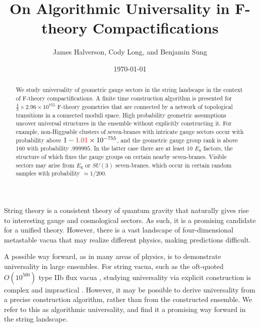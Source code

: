 \documentclass[aps,prl,twocolumn, superscriptaddress,groupedaddress,nofootinbib]{revtex4-1}
\begin{document}
\title{On Algorithmic Universality in F-theory Compactifications}
\author{James Halverson, Cody Long, and Benjamin Sung}

\date{\today}

\begin{abstract}
We study universality of geometric gauge sectors in the string landscape
in the context of F-theory compactifications.
{\color{red} A finite time construction algorithm is presented for $\frac43 \times 2.96 \times 10^{755}$ F-theory geometries that are
connected by a network of topological transitions in a
connected moduli space}. High probability geometric
assumptions uncover universal structures in the ensemble without
explicitly constructing it. For example, non-Higgsable clusters
of seven-branes with intricate gauge sectors occur with
probability above $1-{\color{red}1.01}\times 10^{-755}$,  and
the geometric gauge group rank is above $160$ with probability
$.999995$. In the latter case there are at least $10$ $E_8$
factors, the structure of which fixes the gauge groups
on certain nearby seven-branes. Visible sectors may arise from $E_6$ or $SU(3)$ seven-branes, which occur
in certain random samples with probability $\simeq 1/200$.
\end{abstract}

\maketitle


String theory is a consistent theory of quantum gravity that naturally
gives rise to interesting gauge and cosmological sectors. As
such, it is a promising candidate for a unified theory. However, there is a vast 
landscape of four-dimensional metastable vacua that
may realize different physics, making predictions difficult.


A possible way forward, as in many areas of physics, is to demonstrate
universality in large ensembles. For string vacua, such as the oft-quoted
$O(10^{500})$ type IIb flux vacua
\cite{Bousso:2000xa,*Ashok:2003gk,*Denef:2004ze}, studying universality via
explicit construction is complex and impractical
\cite{Denef:2006ad,*Cvetic:2010ky}. However, it may be possible to derive
universality from a precise construction algorithm, rather than from the
constructed ensemble. We refer to this as algorithmic universality, and find it a
promising way forward in the string landscape.
\end{document}
